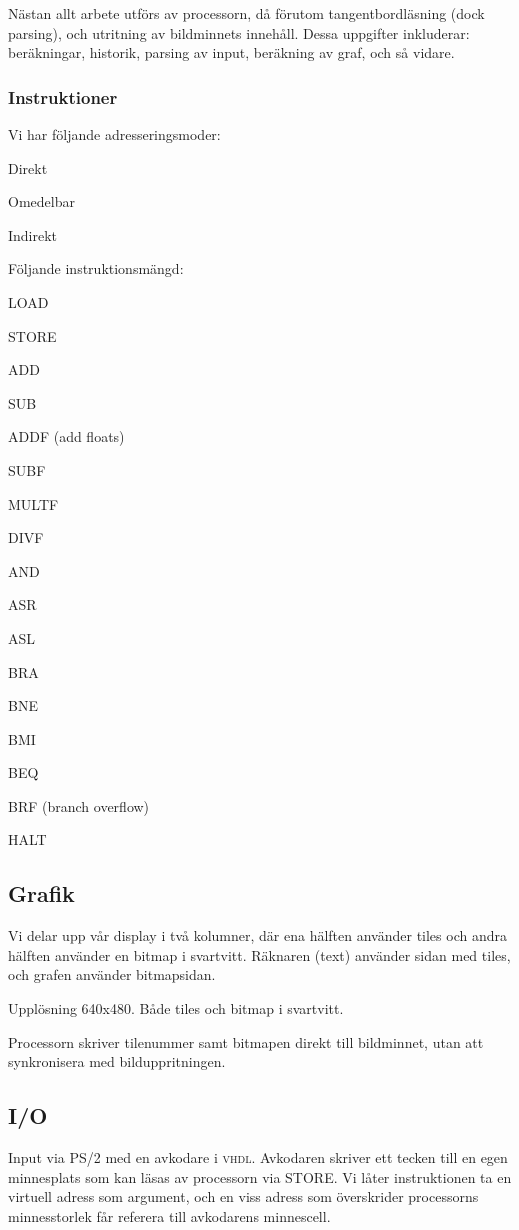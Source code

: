 \documentclass[]{article}
\begin{document}
Nästan allt arbete utförs av processorn, då förutom tangentbordläsning (dock parsing), och utritning av bildminnets innehåll. Dessa uppgifter inkluderar: beräkningar, historik, parsing av input, beräkning av graf, och så vidare.

\subsubsection{Instruktioner}
Vi har följande adresseringsmoder:
\begin{itemize*}
\item Direkt
\item Omedelbar
\item Indirekt 
\end{itemize*}
Följande instruktionsmängd:
\begin{itemize*}
\item LOAD
\item STORE
\item ADD
\item SUB
\item ADDF (add floats)
\item SUBF
\item MULTF
\item DIVF
\item AND
\item ASR
\item ASL
\item BRA
\item BNE
\item BMI
\item BEQ
\item BRF (branch overflow)
\item HALT	
\end{itemize*}

\subsection{Grafik} 
Vi delar upp vår display i två kolumner, där ena hälften använder tiles och andra hälften använder en bitmap i svartvitt. Räknaren (text) använder sidan med tiles, och grafen använder bitmapsidan.

Upplösning 640x480. Både tiles och bitmap i svartvitt.

Processorn skriver tilenummer samt bitmapen direkt till bildminnet, utan att synkronisera med bilduppritningen.

\subsection{I/O}
Input via PS/2 med en avkodare i \textsc{vhdl}. Avkodaren skriver ett tecken till en egen minnesplats som kan läsas av processorn via STORE. Vi låter instruktionen ta en virtuell adress som argument, och en viss adress som överskrider processorns minnesstorlek får referera till avkodarens minnescell.
\end{document}
